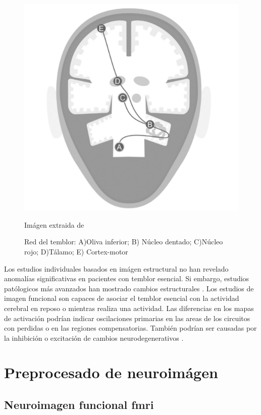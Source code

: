 \begin{figure}[H]
  \centering
    \label{et:cerebelo-talamo-cortex}
    \includegraphics[scale=0.5]{img/cerebelo-talamo-cortex.png}
  \caption{Red del temblor: A)Oliva inferior; B) Núcleo dentado; C)Núcleo rojo; D)Tálamo; E) Cortex-motor} Imágen extraida de \cite{neuessentialsinet}
\end{figure}

Los estudios individuales basados en imágen estructural no han revelado anomalías significativas en pacientes con temblor esencial. Si embargo, estudios patólogicos más avanzados han mostrado cambios estructurales \cite{neuessentialsinet}.
Los estudios de imagen funcional son capaces de asociar el temblor esencial con la actividad cerebral en reposo o mientras realiza una actividad. Las diferencias en los mapas de activación podrían indicar oscilaciones primarias en las areas de los circuitos con perdidas o en las regiones compensatorias. También podrían ser causadas por la inhibición o excitación de cambios neurodegenerativos \cite{neuessentialsinet}.
 

\section{Preprocesado de neuroimágen}
\subsection{Neuroimagen funcional fmri}
